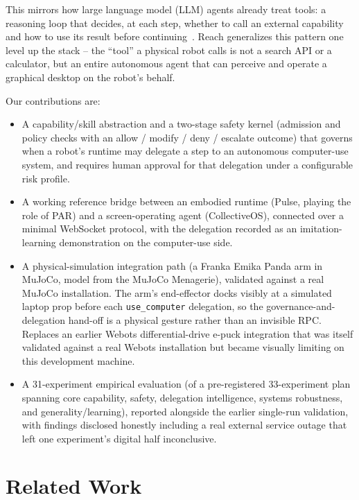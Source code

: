 \documentclass{article}
\begin{document}
This mirrors how large language model (LLM) agents already treat tools: a reasoning loop that decides, at each step, whether to call an external capability and how to use its result before continuing~\citep{yao2023react, schick2023toolformer}. Reach generalizes this pattern one level up the stack -- the ``tool'' a physical robot calls is not a search API or a calculator, but an entire autonomous agent that can perceive and operate a graphical desktop on the robot's behalf.

Our contributions are:
\begin{itemize}
\item A capability/skill abstraction and a two-stage safety kernel (admission and policy checks with an allow / modify / deny / escalate outcome) that governs when a robot's runtime may delegate a step to an autonomous computer-use system, and requires human approval for that delegation under a configurable risk profile.
\item A working reference bridge between an embodied runtime (Pulse, playing the role of PAR) and a screen-operating agent (CollectiveOS), connected over a minimal WebSocket protocol, with the delegation recorded as an imitation-learning demonstration on the computer-use side.
\item A physical-simulation integration path (a Franka Emika Panda arm in MuJoCo, model from the MuJoCo Menagerie), validated against a real MuJoCo installation. The arm's end-effector docks visibly at a simulated laptop prop before each \texttt{use\_computer} delegation, so the governance-and-delegation hand-off is a physical gesture rather than an invisible RPC. Replaces an earlier Webots differential-drive e-puck integration that was itself validated against a real Webots installation but became visually limiting on this development machine.
\item A 31-experiment empirical evaluation (of a pre-registered 33-experiment plan spanning core capability, safety, delegation intelligence, systems robustness, and generality/learning), reported alongside the earlier single-run validation, with findings disclosed honestly including a real external service outage that left one experiment's digital half inconclusive.
\end{itemize}


\section{Related Work}
\end{document}
